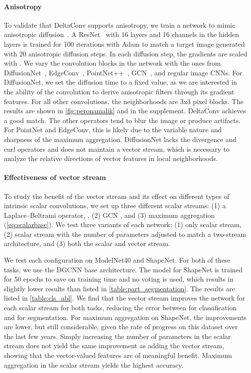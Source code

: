 \documentclass[acmtog, authorversion]{acmart}
\begin{document}
\paragraph*{Anisotropy} To validate that DeltaConv supports anisotropy, we train a network to mimic anisotropic diffusion~\cite{peronamalik}. A ResNet~\cite{he2016deep} with 16 layers and 16 channels in the hidden layers is trained for 100 iterations with Adam \cite{adamkingma} to match a target image generated with 20 anisotropic diffusion steps. In each diffusion step, the gradients are scaled with . We vary the convolution blocks in the network with the ones from DiffusionNet~\cite{Sharp2020DiffusionIA}, EdgeConv~\cite{Wang2019}, PointNet++~\cite{Qi2017b}, GCN~\cite{kipf2017}, and regular image CNNs. For DiffusionNet, we set the diffusion time to a fixed value, as we are interested in the ability of the convolution to derive anisotropic filters through its gradient features. For all other convolutions, the neighborhoods are 3x3 pixel blocks. The results are shown in \autoref{fig:peronamalik} and in the supplement. DeltaConv achieves a good match. The other operators tend to blur the image or produce artifacts. For PointNet and EdgeConv, this is likely due to the variable nature and sharpness of the maximum aggregation. DiffusionNet lacks the divergence and curl operators and does not maintain a vector stream, which is necessary to analyze the relative directions of vector features in local neighborhoods.

\paragraph*{Effectiveness of vector stream} To study the benefit of the vector stream and its effect on different types of intrinsic scalar convolutions, we set up three different scalar streams: (1) a Laplace--Beltrami operator, , (2) GCN \cite{kipf2017}, and (3) maximum aggregation (\autoref{eq:scalarbase}). We test three variants of each network: (1) only scalar stream, (2) scalar stream with the number of parameters adjusted to match a two-stream architecture, and (3) both the scalar and vector stream.

We test each configuration on ModelNet40 and ShapeNet. For both of these tasks, we use the DGCNN base architecture. The model for ShapeNet is trained for 50 epochs to save on training time and no voting is used, which results in slightly lower results than listed in \autoref{table:part_segmentation}. The results are listed in \autoref{table:cls_abl}. We find that the vector stream improves the network for each scalar stream for both tasks, reducing the error between  for classification and  for segmentation. For maximum aggregation on ShapeNet, the improvements are lower, but still considerable, given the rate of progress on this dataset over the last few years. Simply increasing the number of parameters in the scalar stream does not yield the same improvement as adding the vector stream, showing that the vector-valued features are of meaningful benefit. Maximum aggregation in the scalar stream yields the highest accuracy.
\end{document}
